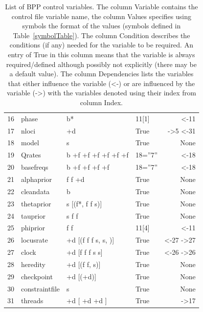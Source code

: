 \documentclass[a4paper]{book}
\numberwithin{equation}{section} \renewcommand{\baselinestretch}{0.55}
\begin{document}
\begin{table}[h]
\begin{center}
{\begin{tabular}{@{}llllr@{}}
      16 & {\color{green1} phase} & b* & 11[1] & <-11 \\
      17 & {\color{blue} nloci} & +d & True & ->5 <-31 \\
      18 & {\color{blue} model} & s & True & None \\
      19 & {\color{blue} Qrates} & b +f +f +f +f +f +f & 18=''7'' & <-18 \\
      20 & {\color{blue} basefreqs} & b +f +f +f +f & 18=''7'' & <-18 \\
      21 & {\color{blue} alphaprior} & f f +d & True & None \\
      22 & {\color{blue} cleandata} & b & True & None \\
      23 & {\color{red} thetaprior} & s [(f*, f f s)] & True & None \\
      24 & {\color{red} tauprior} & s f f & True & None \\
      25 & {\color{yellow1} phiprior} & f f & 11[4] & <-11 \\
      26 & {\color{blue} locusrate} & +d [(f f f s, s, )] & True & <-27 ->27 \\
      27 & {\color{blue} clock} & +d [f f f s s] & True & <-26 ->26 \\
      28 & {\color{blue} heredity} & +d [(f f, s)] & True & None \\
      29 & {\color{blue} checkpoint} & +d [(+d)] & True & None \\
      30 & {\color{blue} constraintfile} & s & True & None \\
      31 & {\color{yellow1} threads} & +d [ +d +d ] & True & ->17 \\
      \bottomrule
    \end{tabular}
    }
    \caption{List of BPP control variables. The column Variable
      contains the control file variable name, the column Values
      specifies using symbols the format of the values (symbols
      defined in Table~\ref{symbolTable}). The column Condition
      describes the conditions (if any) needed for the variable to be
      required. An entry of True in this column means that the
      variable is always required/defined although possibly not
      explicitly (there may be a default value). The column
      Dependencies lists the variables that either influence the
      variable (<-) or are influenced by the variable (->) with the
      variables denoted using their index from column Index.}
    \label{variableTable}
  \end{center}
\end{table}
\end{document}
